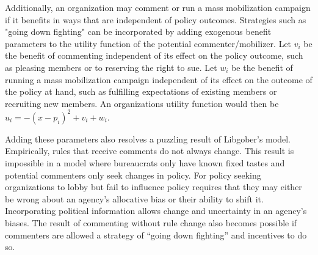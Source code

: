 Additionally, an organization may comment or run a mass mobilization campaign if it benefits in ways that are independent of policy outcomes. Strategies such as "going down fighting" can be incorporated by adding exogenous benefit parameters to the utility function of the potential commenter/mobilizer. Let $v_i$ be the benefit of commenting independent of its effect on the policy outcome, such as pleasing members or to reserving the right to sue. Let $w_i$ be the benefit of running a mass mobilization campaign independent of its effect on the outcome of the policy at hand, such as fulfilling expectations of existing members or recruiting new members. An organizations utility function would then be $u_i = -(x - p_i)^2 + v_i + w_i$. 

Adding these parameters also resolves a puzzling result of Libgober's model. Empirically, rules that receive comments do not always change. This result is impossible in a model where bureaucrats only have known fixed tastes and potential commenters only seek changes in policy. For policy seeking organizations to lobby but fail to influence policy requires that they may either be wrong about an agency's allocative bias or their ability to shift it. Incorporating political information allows change and uncertainty in an agency's biases. 
The result of commenting without rule change also becomes possible if commenters are allowed a strategy of ``going down fighting'' and incentives to do so. 

